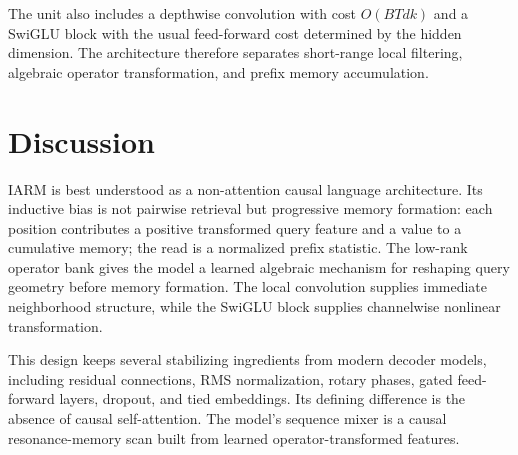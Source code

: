 \documentclass[10pt]{article}
\begin{document}
The unit also includes a depthwise convolution with cost $O(BTdk)$ and a SwiGLU block with the usual feed-forward cost determined by the hidden dimension. The architecture therefore separates short-range local filtering, algebraic operator transformation, and prefix memory accumulation.

\section{Discussion}
IARM is best understood as a non-attention causal language architecture. Its inductive bias is not pairwise retrieval but progressive memory formation: each position contributes a positive transformed query feature and a value to a cumulative memory; the read is a normalized prefix statistic. The low-rank operator bank gives the model a learned algebraic mechanism for reshaping query geometry before memory formation. The local convolution supplies immediate neighborhood structure, while the SwiGLU block supplies channelwise nonlinear transformation.

This design keeps several stabilizing ingredients from modern decoder models, including residual connections, RMS normalization, rotary phases, gated feed-forward layers, dropout, and tied embeddings. Its defining difference is the absence of causal self-attention. The model's sequence mixer is a causal resonance-memory scan built from learned operator-transformed features.
\end{document}
